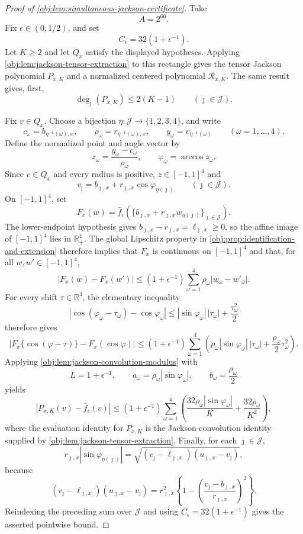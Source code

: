 \begin{proof}[Proof of \cref{obj:lem:simultaneous-jackson-certificate}]
Take
\[
A=2^{60}.
\]
Fix \(\epsilon\in(0,1/2)\), and set
\[
C_\epsilon=32(1+\epsilon^{-1}).
\]
Let \(K\ge2\) and let \(Q_x\) satisfy the displayed hypotheses. Applying
\cref{obj:lem:jackson-tensor-extraction} to this rectangle gives the tensor Jackson polynomial
\(P_{x,K}\) and a normalized centered polynomial \(\mathcal R_{x,K}\). The same result gives, first,
\[
\deg_{\jmath}(P_{x,K})\le 2(K-1)
\qquad(\jmath\in\mathcal J).
\]

Fix \(v\in Q_x\). Choose a bijection \(\eta:\mathcal J\to\{1,2,3,4\}\), and write
\[
c_\omega=b_{\eta^{-1}(\omega),x},
\qquad
\rho_\omega=r_{\eta^{-1}(\omega),x},
\qquad
y_\omega=v_{\eta^{-1}(\omega)}
\qquad(\omega=1,\ldots,4).
\]
Define the normalized point and angle vector by
\[
z_\omega=\frac{y_\omega-c_\omega}{\rho_\omega},
\qquad
\varphi_\omega=\arccos z_\omega .
\]
Since \(v\in Q_x\) and every radius is positive, \(z\in[-1,1]^4\) and
\[
v_{\jmath}=b_{\jmath,x}+r_{\jmath,x}\cos\varphi_{\eta(\jmath)}
\qquad(\jmath\in\mathcal J).
\]
On \([-1,1]^4\), set
\[
F_x(w)
=
\bar f_\epsilon\!\left(
\bigl\{b_{\jmath,x}+r_{\jmath,x}w_{\eta(\jmath)}\bigr\}_{\jmath\in\mathcal J}
\right).
\]
The lower-endpoint hypothesis gives \(b_{\jmath,x}-r_{\jmath,x}=\ell_{\jmath,x}\ge0\), so the affine image of
\([-1,1]^4\) lies in \(\mathbb R_+^4\). The global Lipschitz property in
\cref{obj:prop:identification-and-extension} therefore implies that \(F_x\) is continuous on
\([-1,1]^4\) and that, for all \(w,w'\in[-1,1]^4\),
\[
|F_x(w)-F_x(w')|
\le
(1+\epsilon^{-1})
\sum_{\omega=1}^4
\rho_\omega |w_\omega-w'_\omega|.
\]
For every shift \(\tau\in\mathbb R^4\), the elementary inequality
\[
|\cos(\varphi_\omega-\tau_\omega)-\cos\varphi_\omega|
\le
|\sin\varphi_\omega|\,|\tau_\omega|+\frac{\tau_\omega^2}{2}
\]
therefore gives
\[
\left|
F_x\{\cos(\varphi-\tau)\}-F_x(\cos\varphi)
\right|
\le
(1+\epsilon^{-1})
\sum_{\omega=1}^4
\left(
\rho_\omega|\sin\varphi_\omega|\,|\tau_\omega|
+\frac{\rho_\omega}{2}\tau_\omega^2
\right).
\]
Applying \cref{obj:lem:jackson-convolution-modulus} with
\[
L=1+\epsilon^{-1},
\qquad
a_\omega=\rho_\omega|\sin\varphi_\omega|,
\qquad
b_\omega=\frac{\rho_\omega}{2}
\]
yields
\[
|P_{x,K}(v)-\bar f_\epsilon(v)|
\le
(1+\epsilon^{-1})
\sum_{\omega=1}^4
\left(
\frac{32\rho_\omega|\sin\varphi_\omega|}{K}
+
\frac{32\rho_\omega}{K^2}
\right),
\]
where the evaluation identity for \(P_{x,K}\) is the Jackson-convolution identity supplied by
\cref{obj:lem:jackson-tensor-extraction}.
Finally, for each \(\jmath\in\mathcal J\),
\[
r_{\jmath,x}|\sin\varphi_{\eta(\jmath)}|
=
\sqrt{(v_{\jmath}-\ell_{\jmath,x})(u_{\jmath,x}-v_{\jmath})},
\]
because
\[
(v_{\jmath}-\ell_{\jmath,x})(u_{\jmath,x}-v_{\jmath})
=
r_{\jmath,x}^2
\left\{
1-\left(\frac{v_{\jmath}-b_{\jmath,x}}{r_{\jmath,x}}\right)^2
\right\}.
\]
Reindexing the preceding sum over \(\mathcal J\) and using
\(C_\epsilon=32(1+\epsilon^{-1})\) gives the asserted pointwise bound.


\end{proof}
